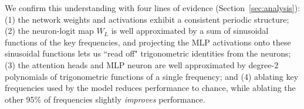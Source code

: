 \documentclass{article} %
\begin{document}
We confirm this understanding with four lines of evidence (Section~\ref{sec:analysis}): (1) the network weights and activations exhibit a consistent periodic structure; (2) the neuron-logit map $W_L$ is well approximated by a sum of sinusoidal functions of the key frequencies, and projecting the MLP activations onto these sinusoidal functions lets us ``read off" trigonometric identities from the neurons; (3) the attention heads and MLP neuron are well approximated by degree-$2$ polynomials of trigonometric functions of a single frequency; and (4) ablating key frequencies used by the model reduces performance to chance, while ablating the other 95\% of frequencies slightly \emph{improves} performance.

 
\end{document}
